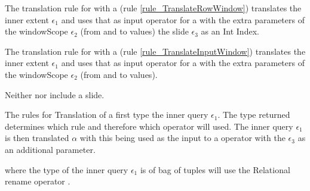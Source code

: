 
The translation rule for  with a  (rule \ref{rule_TranslateRowWindow}) translates the inner extent $\epsilon_1$ and uses that as input operator  for a  with the extra parameters of the windowScope $\epsilon_2$ (from and to values) the slide $\epsilon_3$ as an Int Index.         

The translation rule for  with a  (rule \ref{rule_TranslateInputWindow}) translates the inner extent $\epsilon_1$ and uses that as input operator  for a  with the extra parameters of the windowScope $\epsilon_2$ (from and to values).

Neither  nor  include a slide.

The rules for Translation of a  first type the inner query $\epsilon_1$.
The type returned determines which rule and therefore which  operator will used.
The inner query $\epsilon_1$ is then translated $\alpha$ with this being used as the input to a  operator with the  $\epsilon_3$ as an additional parameter.

 where the type of the inner query $\epsilon_1$ is of bag of tuples will use the Relational rename operator .


